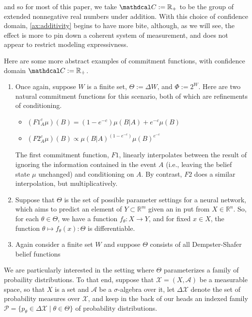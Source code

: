\documentclass{uai2023}
\theoremstyle{plain}
\theoremstyle{definition}
\newcommand\cofunc{commitment function}
\newcommand\confdom{\mathdcal C}
\newcommand\Rplus{\mathbb R_+}
\newcommand\X{\mathcal X}
\begin{document}
\begin{phaseout}
and so for most of this paper, we take $\confdom := \Rplus$ to be the group of extended nonnegative real numbers under addition.
With this choice of confidence domain, \cref{ax:additivity} begins to have more bite, although, as we will see, the effect is more to pin down a coherent system of measurement, and does not appear to restrict modeling expressivness.



Here are some more abstract examples of \cofunc s, with confidence domain
$\confdom := \mathbb R_+$.
\begin{enumerate}
\item
Once again, suppose $W$ is a finite set,
$\Theta := \Delta W$, and $\Phi := 2^W$.
Here are two natural \cofunc s for this scenario, both of which are refinements of conditioning.
\begin{itemize}
	\item
	$\displaystyle
		(F1^c_A \mu)(B) = (1-e^{-c}) \mu(B|A) +  e^{-c} \mu(B)
	$
	\item
	$\displaystyle
		(F2^c_A \mu)(B) \propto \mu(B|A)^{(1-e^{-c})} \mu(B)^{e^{-c}}
	$
\end{itemize}
The first \cofunc, $F1$, linearly interpolates between the result of ignoring the information contained in the event $A$ (i.e., leaving the belief state $\mu$ unchanged) and conditioning on $A$.
By contrast, $F2$ does a similar interpolation, but multiplicatively.

\item
Suppose that $\Theta$ is the set of possible parameter settings for a neural network, which aims to predict an element of $Y \subset \mathbb R^{m}$ given an in put from $X \in \mathbb R^{n}$.
So, for each $\theta \in \Theta$, we have a function $f_\theta : X \to Y$, and for fixed $x \in X$, the function $\theta \mapsto f_\theta(x) : \Theta$ is differentiable.






\item
Again consider a finite set $W$ and suppose $\Theta$ consists of all Dempster-Shafer belief functions
\end{enumerate}







We are particularly interested in the setting where $\Theta$ parameterizes a family of probaility distributions.
To that end, suppose that $\X = (X, \mathcal A)$ be a measurable space, so that $X$ is a set and $\mathcal A$ be a $\sigma$-algebra over it, let $\Delta \X$ denote the set of probability measures over $\X$,
and keep in the back of our heads an indexed family
$
	\mathcal P =
	\{ p_\theta \in\Delta\X \mid \theta \in \Theta \}
$ of probability distributions.
\end{phaseout}
\end{document}
